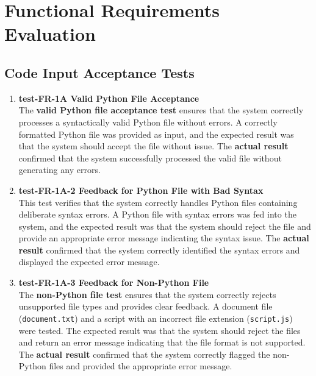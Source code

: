 \documentclass[12pt, titlepage]{article}
\begin{document}
\section{Functional Requirements Evaluation}
\subsection{Code Input Acceptance Tests}
\begin{enumerate}

  \item \textbf{test-FR-1A Valid Python File Acceptance} \\[2mm]
    The \textbf{valid Python file acceptance test} ensures that the
    system correctly processes a syntactically valid Python file
    without errors. A correctly formatted Python file was provided as
    input, and the expected result was that the system should accept
    the file without issue. The \textbf{actual result} confirmed that
    the system successfully processed the valid file without
    generating any errors.

  \item \textbf{test-FR-1A-2 Feedback for Python File with Bad Syntax} \\[2mm]
    This test verifies that the system correctly handles Python files
    containing deliberate syntax errors. A Python file with syntax
    errors was fed into the system, and the expected result was that
    the system should reject the file and provide an appropriate
    error message indicating the syntax issue. The \textbf{actual
    result} confirmed that the system correctly identified the syntax
    errors and displayed the expected error message.

  \item \textbf{test-FR-1A-3 Feedback for Non-Python File} \\[2mm]
    The \textbf{non-Python file test} ensures that the system
    correctly rejects unsupported file types and provides clear
    feedback. A document file (\texttt{document.txt}) and a script
    with an incorrect file extension (\texttt{script.js}) were
    tested. The expected result was that the system should reject the
    files and return an error message indicating that the file format
    is not supported. The \textbf{actual result} confirmed that the
    system correctly flagged the non-Python files and provided the
    appropriate error message.

\end{enumerate}
\end{document}
